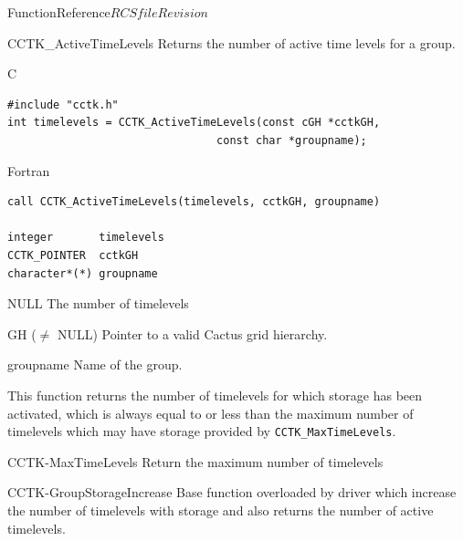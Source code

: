 \begin{cactuspart}{FunctionReference}{$RCSfile$}{$Revision$}
\begin{FunctionDescription}{CCTK\_ActiveTimeLevels}{}
\label{CCTK-ActiveTimeLevels}
Returns the number of active time levels for a group.
\begin{SynopsisSection}
\begin{Synopsis}{C}
\begin{verbatim}
#include "cctk.h"
int timelevels = CCTK_ActiveTimeLevels(const cGH *cctkGH,
                                const char *groupname);
\end{verbatim}
\end{Synopsis}
\begin{Synopsis}{Fortran}
\begin{verbatim}
call CCTK_ActiveTimeLevels(timelevels, cctkGH, groupname)

integer       timelevels
CCTK_POINTER  cctkGH
character*(*) groupname
\end{verbatim}
\end{Synopsis}
\end{SynopsisSection}

\begin{ResultSection}
\begin{Result}{NULL}
The number of timelevels
\end{Result}
\end{ResultSection}

\begin{ParameterSection}
\begin{Parameter}{GH ($\ne$ NULL)}
Pointer to a valid Cactus grid hierarchy.
\end{Parameter}
\begin{Parameter}{groupname}
Name of the group.
\end{Parameter}
\end{ParameterSection}

\begin{Discussion}
This function returns the number of timelevels for which storage has been activated, which is always equal to or less than the maximum number of 
timelevels which may have storage provided by {\tt CCTK\_MaxTimeLevels}.
\end{Discussion}

\begin{SeeAlsoSection}
\begin{SeeAlso}{CCTK-MaxTimeLevels}
Return the maximum number of timelevels
\end{SeeAlso}
\begin{SeeAlso}{CCTK-GroupStorageIncrease}
Base function overloaded by driver which increase the number of timelevels 
with storage and also returns the number of active timelevels.
\end{SeeAlso}
\end{SeeAlsoSection}
\end{FunctionDescription}




\end{cactuspart}
